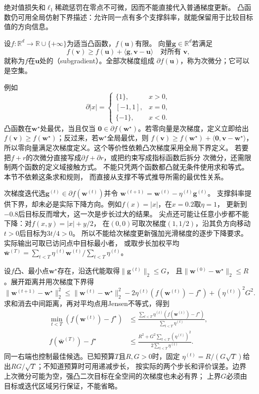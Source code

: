 绝对值损失和$\ell_1$稀疏惩罚在零点不可微，因而不能直接代入普通梯度更新。
凸函数仍可用全局仿射下界描述：允许同一点有多个支撑斜率，就能保留用于比较目标值的方向信息。
\begin{definition}[凸次梯度与次微分]
\label{def:opt-convex-subgradient}
设$f:\mathbb R^d\to\mathbb R\cup\{+\infty\}$为适当凸函数，$f(\bm u)$有限。
向量$\bm{g}\in\mathbb R^d$若满足
\[
  f(\bm{v})\geq f(\bm{u})+\langle\bm{g},\bm{v}-\bm{u}\rangle
  \quad\text{对所有 }\bm{v},
\]
就称为$f$在$\bm{u}$处的（subgradient）。全部次梯度组成
$\partial f(\bm{u})$，称为次微分；它可以是空集。
\end{definition}
例如
\[
  \partial |x|=
  \begin{cases}
    \{1\},&x>0,\\
    [-1,1],&x=0,\\
    \{-1\},&x<0.
  \end{cases}
\]
凸函数在$\bm{w}^{\star}$处最优，当且仅当
$\bm{0}\in\partial f(\bm{w}^{\star})$。若零向量是次梯度，定义立即给出
$f(\bm{v})\geq f(\bm{w}^{\star})$；反过来，若$\bm{w}^{\star}$全局最优，则
$f(\bm{v})\geq f(\bm{w}^{\star})+\langle\bm{0},\bm{v}-\bm{w}^{\star}\rangle$，
所以零向量满足次梯度定义。这个等价性依赖凸次梯度采用全局下界定义。
若要把$f+r$的次微分直接写成$\partial f+\partial r$，或把约束写成指标函数后拆分
次微分，还需限制两个函数的定义域接触方式。
不能只凭两个函数都凸就无条件使用求和等式。本节不依赖这条求和规则，
而直接从支撑不等式推导所需的最优性关系。

次梯度迭代选$\bm g^{(t)}\in\partial f(\bm w^{(t)})$并令
$\bm w^{(t+1)}=\bm w^{(t)}-\eta^{(t)}\bm g^{(t)}$。
支撑斜率提供下界，却未必是实际下降方向。例如$f(x)=|x|$，在$x=0.2$取$\eta=1$，
更新到$-0.8$后目标反而增大，这一次是步长过大的结果。
尖点还可能让任意小步都不能下降：对$f(x,y)=|x|+y/2$，
在$(0,0)$可取次梯度$(1,1/2)$，沿其负方向移动$t>0$后目标为$3t/4>0$。
所以不能给次梯度更新强加光滑梯度的逐步下降要求。实际输出可取已访问点中目标最小者，
或取步长加权平均$\bar{\bm w}^{(T)}=\sum_{t<T}\eta^{(t)}\bm w^{(t)}/\sum_{t<T}\eta^{(t)}$。

设$f$凸、最小点$\bm w^\star$存在，沿迭代能取得$\|\bm g^{(t)}\|_2\leq G$，
且$\|\bm w^{(0)}-\bm w^\star\|_2\leq R$。展开距离并用次梯度下界得
\[
 \|\bm w^{(t+1)}-\bm w^\star\|_2^2
 \leq\|\bm w^{(t)}-\bm w^\star\|_2^2
 -2\eta^{(t)}(f(\bm w^{(t)})-f^\star)+(\eta^{(t)})^2G^2.
\]
求和消去中间距离，再对平均点用Jensen不等式，得到
\begin{equation}
\begin{aligned}
 \min_{t<T}(f(\bm w^{(t)})-f^\star)
 &\leq\frac{\sum_{t<T}\eta^{(t)}(f(\bm w^{(t)})-f^\star)}{\sum_{t<T}\eta^{(t)}},\\
 f(\bar{\bm w}^{(T)})-f^\star
 &\leq\frac{R^2+G^2\sum_{t<T}(\eta^{(t)})^2}{2\sum_{t<T}\eta^{(t)}}.
\end{aligned}
 \label{eq:opt-subgradient-finite-rate}
\end{equation}
同一右端也控制最佳候选。已知预算$T$且$R,G>0$时，固定
$\eta^{(t)}=R/(G\sqrt T)$给出$RG/\sqrt T$；不知道预算时可用递减步长，
按实际的两个步长和评价误差。边界上次微分可能为空，强凸二次目标在全空间的次梯度也未必有界；
上界$G$必须由目标或迭代区域另行保证，不能省略。

